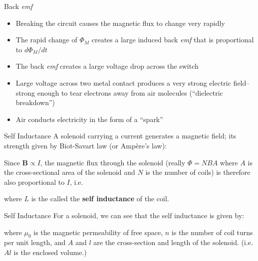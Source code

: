 \documentclass[12pt,aspectratio=169]{beamer}
\newcommand{\mb}[1]{\mathbf{#1}}
\newcommand{\eq}[2]{\vspace{#1}{\Large\begin{displaymath}#2\end{displaymath}}}
\begin{document}
\begin{frame}{Back \emph{emf}}
  \begin{center}
  \end{center}
  \begin{itemize}
  \item Breaking the circuit causes the magnetic flux to change very rapidly
  \item The rapid change of $\Phi_M$ creates a large induced back \emph{emf}
    that is proportional to $d\Phi_M/dt$
  \item The back \emph{emf} creates a large voltage drop across the switch
  \item Large voltage across two metal contact produces a very strong electric
    field--strong enough to tear electrons away from air molecules
    (``dielectric breakdown'')
  \item Air conducts electricity in the form of a ``spark''
  \end{itemize}
\end{frame}



\begin{frame}{Self Inductance}
  A solenoid carrying a current generates a magnetic field; its strength given
  by Biot-Savart law (or Amp\`{e}re's law):

  \eq{-.2in}{
    B=\frac{\mu_0NI}{L}
  }

  Since $\mb{B}\propto I$, the magnetic flux through the solenoid (really
  $\Phi=NBA$ where $A$ is the cross-sectional area of the solenoid and $N$ is
  the number of coils) is therefore also proportional to $I$, i.e.

  \eq{-.2in}{
    \boxed{\Phi_M=LI}
  }

  where $L$ is the called the \textbf{self inductance} of the coil.
\end{frame}



\begin{frame}{Self Inductance}
  For a solenoid, we can see that the self inductance is given by:

  \eq{-.2in}{
    \boxed{L=\frac{\Phi_M}{I}=\mu_0 n^2Al}
  }

  where $\mu_0$ is the magnetic permeability of free space, $n$ is the number of
  coil turns per unit length, and $A$ and $l$ are the cross-section and length
  of the solenoid. (i.e. $Al$ is the enclosed volume.)
\end{frame}
\end{document}
